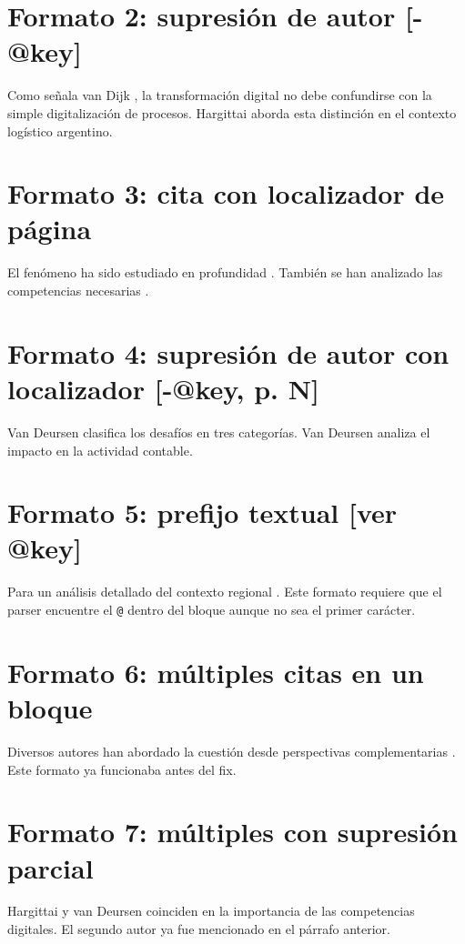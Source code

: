 \documentclass{article}
\begin{document}
\section{Formato 2: supresión de autor [-@key]}
Como señala van Dijk \autocite{2563-VANDIJK2020}, la transformación digital no debe confundirse con la simple digitalización de procesos. Hargittai \autocite{2565-HARGITTAI2002} aborda esta distinción en el contexto logístico argentino.


\section{Formato 3: cita con localizador de página}
El fenómeno ha sido estudiado en profundidad \autocite{2564-VANDEURSEN2019}. También se han analizado las competencias necesarias \autocite{2564-VANDEURSEN2019}.


\section{Formato 4: supresión de autor con localizador [-@key, p. N]}
Van Deursen \autocite{2564-VANDEURSEN2019} clasifica los desafíos en tres categorías. Van Deursen \autocite{2564-VANDEURSEN2019} analiza el impacto en la actividad contable.


\section{Formato 5: prefijo textual [ver @key]}
Para un análisis detallado del contexto regional \autocite{2566-CEPAL2021}. Este formato requiere que el parser encuentre el \texttt{@} dentro del bloque aunque no sea el primer carácter.


\section{Formato 6: múltiples citas en un bloque}
Diversos autores han abordado la cuestión desde perspectivas complementarias \autocite{2565-HARGITTAI2002,2562-WARSCHAUER2004}. Este formato ya funcionaba antes del fix.


\section{Formato 7: múltiples con supresión parcial}
Hargittai y van Deursen \autocite{2565-HARGITTAI2002,2564-VANDEURSEN2019} coinciden en la importancia de las competencias digitales. El segundo autor ya fue mencionado en el párrafo anterior.
\end{document}
